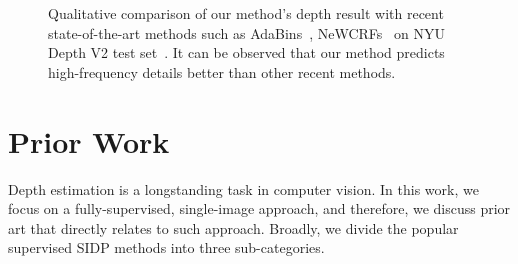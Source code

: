 \documentclass{article} \usepackage{iclr2023_conference, times}
\begin{document}
\begin{figure}[t]
\centering
{}
\caption{\small Qualitative comparison of our method's depth result with recent state-of-the-art methods such as AdaBins~\citep{bhat2021adabins}, NeWCRFs~\citep{yuan2022new} on NYU Depth V2 test set~\citep{silberman2012indoor}. It can be observed that our method predicts high-frequency details better than other recent methods.}
\label{fig:teaser2}
\end{figure}

































\section{Prior Work}
Depth estimation is a longstanding task in computer vision. In this work, we focus on a fully-supervised, single-image approach, and therefore, we discuss prior art that directly relates to such approach. Broadly, we divide the popular supervised SIDP methods into three sub-categories.
\end{document}
